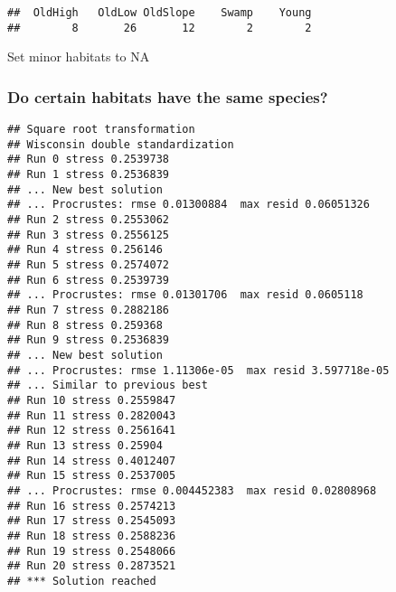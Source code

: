 \documentclass[
]{book}
\newenvironment{Shaded}{\begin{snugshade}}{\end{snugshade}}
\newcommand{\CommentTok}[1]{\textcolor[rgb]{0.56,0.35,0.01}{\textit{#1}}}
\newcommand{\ConstantTok}[1]{\textcolor[rgb]{0.00,0.00,0.00}{#1}}
\newcommand{\FunctionTok}[1]{\textcolor[rgb]{0.00,0.00,0.00}{#1}}
\newcommand{\NormalTok}[1]{#1}
\newcommand{\OtherTok}[1]{\textcolor[rgb]{0.56,0.35,0.01}{#1}}
\newcommand{\SpecialCharTok}[1]{\textcolor[rgb]{0.00,0.00,0.00}{#1}}
\newcommand{\StringTok}[1]{\textcolor[rgb]{0.31,0.60,0.02}{#1}}
\begin{document}
\begin{Shaded}
\end{Shaded}

\begin{verbatim}
##  OldHigh   OldLow OldSlope    Swamp    Young 
##        8       26       12        2        2
\end{verbatim}

Set minor habitats to NA

\begin{Shaded}
\end{Shaded}

\hypertarget{do-certain-habitats-have-the-same-species}{%
\subsubsection{Do certain habitats have the same species?}\label{do-certain-habitats-have-the-same-species}}

\begin{verbatim}
## Square root transformation
## Wisconsin double standardization
## Run 0 stress 0.2539738 
## Run 1 stress 0.2536839 
## ... New best solution
## ... Procrustes: rmse 0.01300884  max resid 0.06051326 
## Run 2 stress 0.2553062 
## Run 3 stress 0.2556125 
## Run 4 stress 0.256146 
## Run 5 stress 0.2574072 
## Run 6 stress 0.2539739 
## ... Procrustes: rmse 0.01301706  max resid 0.0605118 
## Run 7 stress 0.2882186 
## Run 8 stress 0.259368 
## Run 9 stress 0.2536839 
## ... New best solution
## ... Procrustes: rmse 1.11306e-05  max resid 3.597718e-05 
## ... Similar to previous best
## Run 10 stress 0.2559847 
## Run 11 stress 0.2820043 
## Run 12 stress 0.2561641 
## Run 13 stress 0.25904 
## Run 14 stress 0.4012407 
## Run 15 stress 0.2537005 
## ... Procrustes: rmse 0.004452383  max resid 0.02808968 
## Run 16 stress 0.2574213 
## Run 17 stress 0.2545093 
## Run 18 stress 0.2588236 
## Run 19 stress 0.2548066 
## Run 20 stress 0.2873521 
## *** Solution reached
\end{verbatim}
\end{document}
